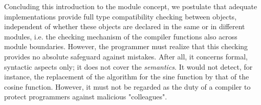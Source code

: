 Concluding this introduction to the module concept, we postulate that adequate implementations
provide full type compatibility checking between objects, independent of whether these objects are
declared in the same or in different modules, i.e. the checking mechanism of the compiler functions
also across module boundaries. However, the programmer must realize that this checking provides
no absolute safeguard against mistakes. After all, it concerns formal, syntactic aspects only; it
does not cover the \emph{semantics}. It would not detect, for instance, the replacement of the
algorithm for the sine function by that of the cosine function. However, it must not be regarded
as the duty of a compiler to protect programmers against malicious "colleagues".
